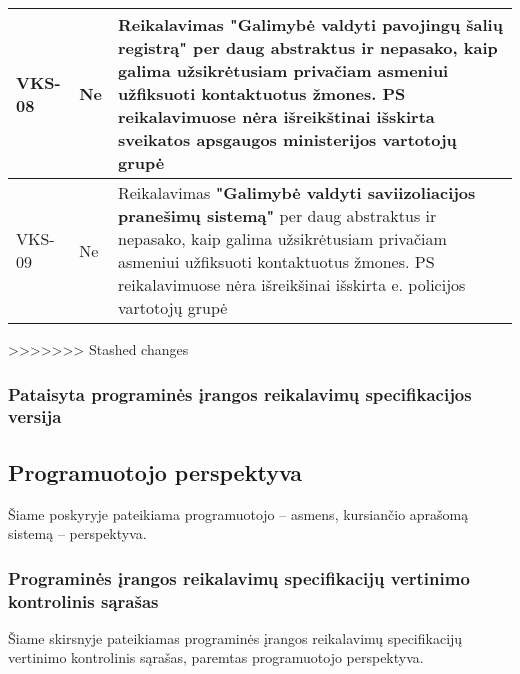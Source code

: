 \documentclass{VUMIFPSkursinis}
\begin{document}
\begin{center}
\begin{longtable}{|C{2cm}|L{2.5cm}|L{10cm}|}
 					VKS-08 &
 					Ne&
 					Reikalavimas \textbf{"Galimybė valdyti pavojingų šalių registrą"} per daug abstraktus ir nepasako, kaip galima užsikrėtusiam privačiam asmeniui užfiksuoti kontaktuotus žmones. PS reikalavimuose nėra išreikštinai išskirta sveikatos apsgaugos ministerijos vartotojų grupė\\ \hline  
 					VKS-09 &
 					Ne&
 					Reikalavimas \textbf{"Galimybė valdyti saviizoliacijos pranešimų sistemą"} per daug abstraktus ir nepasako, kaip galima užsikrėtusiam privačiam asmeniui užfiksuoti kontaktuotus žmones. PS reikalavimuose nėra išreikšinai išskirta e. policijos vartotojų grupė\\ \hline			
				\end{longtable}
			\end{center}		
			
>>>>>>> Stashed changes
\subsubsection{Pataisyta programinės įrangos reikalavimų specifikacijos versija}
\subsection{Programuotojo perspektyva}

Šiame poskyryje pateikiama programuotojo -- asmens, kursiančio aprašomą sistemą -- perspektyva.

\subsubsection{Programinės įrangos reikalavimų specifikacijų vertinimo kontrolinis sąrašas}

Šiame skirsnyje pateikiamas programinės įrangos reikalavimų specifikacijų vertinimo kontrolinis sąrašas,
paremtas programuotojo perspektyva.
\end{document}
